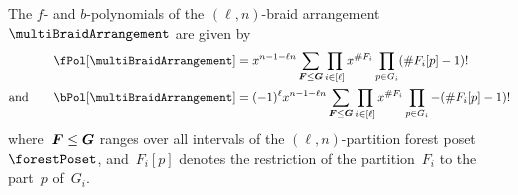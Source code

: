 \begin{corollary}
\label{coro:fbvectorsMultiBraidArrangement}
The $f$- and $b$-polynomials of the $(\ell,n)$-braid arrangement~$\multiBraidArrangement$ are given by
\begin{align*}
\fPol[\multiBraidArrangement] & = x^{n-1-\ell n}\sum_{\b{F} \le \b{G}} \prod_{i \in [\ell]} x^{\#F_i} \prod_{p \in G_i} (\# F_i[p]-1)!\\
\text{and}\qquad
\bPol[\multiBraidArrangement] & = (-1)^\ell x^{n-1-\ell n} \sum_{\b{F} \le \b{G}} \prod_{i \in [\ell]} x^{\#F_i} \prod_{p \in G_i} -(\# F_i[p]-1)!
\end{align*}
where~$\boldsymbol{F} \le \boldsymbol{G}$ ranges over all intervals of the $(\ell,n)$-partition forest poset~$\forestPoset$, and~$F_i[p]$ denotes the restriction of the partition~$F_i$ to the part~$p$ of~$G_i$.
\end{corollary}

